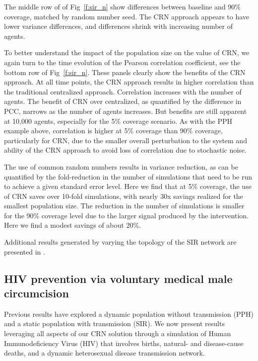 \documentclass[10pt,letterpaper]{article}
\begin{document}
The middle row of of Fig~\ref{f:sir_n} show differences between baseline and 90\% coverage, matched by random number seed. The CRN approach appears to have lower variance differences, and differences shrink with increasing number of agents.

To better understand the impact of the population size on the value of CRN, we again turn to the time evolution of the Pearson correlation coefficient, see the bottom row of Fig~\ref{f:sir_n}. These panels clearly show the benefits of the CRN approach. At all time points, the CRN approach results in higher correlation than the traditional centralized approach. Correlation increases with the number of agents. The benefit of CRN over centralized, as quantified by the difference in PCC, narrows as the number of agents increases. But benefits are still apparent at 10,000 agents, especially for the 5\% coverage scenario. As with the PPH example above, correlation is higher at 5\% coverage than 90\% coverage, particularly for CRN, due to the smaller overall perturbation to the system and ability of the CRN approach to avoid loss of correlation due to stochastic noise.

The use of common random numbers results in variance reduction, as can be quantified by the fold-reduction in the number of simulations that need to be run to achieve a given standard error level. Here we find that at 5\% coverage, the use of CRN saves over 10-fold simulations, with nearly 30x savings realized for the smallest population size. The reduction in the number of simulations is smaller for the 90\% coverage level due to the larger signal produced by the intervention. Here we find a modest savings of about 20\%.

Additional results generated by varying the topology of the SIR network are presented in .



\subsection*{HIV prevention via voluntary medical male circumcision}

Previous results have explored a dynamic population without transmission (PPH) and a static population with transmission (SIR). We now present results leveraging all aspects of our CRN solution through a simulation of Human Immunodeficiency Virus (HIV) that involves births, natural- and disease-cause deaths, and a dynamic heterosexual disease transmission network.
\end{document}
